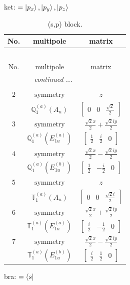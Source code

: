 \documentclass[fleqn,8pt,landscape]{jsarticle}
\begin{document}
\noindent
ket: $=\ket{p_{x}}, \ket{p_{y}}, \ket{p_{z}}$
\renewcommand{\arraystretch}{1.6}
\begin{longtable}{ccc}
\caption{(s,p) block.}
 \\
 \hline \hline
No. & multipole & matrix \\ \hline \endfirsthead

\multicolumn{2}{l}{\tablename\ \thetable{}} \\
 \hline \hline
No. & multipole & matrix \\ \hline \endhead

 \hline \hline
\multicolumn{2}{r}{\footnotesize\it continued ...} \\ \endfoot

 \hline \hline
\multicolumn{2}{r}{} \\ \endlastfoot

$ 2 $ & $ \text{symmetry} $ & $ z $ \\
$  $ & $ \mathbb{Q}_{1}^{(a)}(A_{u}) $ & $ \begin{bmatrix} 0 & 0 & \frac{\sqrt{2}}{2} \end{bmatrix} $ \\ \hline
$ 3 $ & $ \text{symmetry} $ & $ \frac{\sqrt{2} x}{2} + \frac{\sqrt{2} i y}{2} $ \\
$  $ & $ \mathbb{Q}_{1}^{(a)}(E_{1u}^{(a)}) $ & $ \begin{bmatrix} \frac{1}{2} & \frac{i}{2} & 0 \end{bmatrix} $ \\ \hline
$ 4 $ & $ \text{symmetry} $ & $ \frac{\sqrt{2} x}{2} - \frac{\sqrt{2} i y}{2} $ \\
$  $ & $ \mathbb{Q}_{1}^{(a)}(E_{1u}^{(b)}) $ & $ \begin{bmatrix} \frac{1}{2} & - \frac{i}{2} & 0 \end{bmatrix} $ \\ \hline
$ 5 $ & $ \text{symmetry} $ & $ z $ \\
$  $ & $ \mathbb{T}_{1}^{(a)}(A_{u}) $ & $ \begin{bmatrix} 0 & 0 & \frac{\sqrt{2} i}{2} \end{bmatrix} $ \\ \hline
$ 6 $ & $ \text{symmetry} $ & $ \frac{\sqrt{2} x}{2} + \frac{\sqrt{2} i y}{2} $ \\
$  $ & $ \mathbb{T}_{1}^{(a)}(E_{1u}^{(a)}) $ & $ \begin{bmatrix} \frac{i}{2} & - \frac{1}{2} & 0 \end{bmatrix} $ \\ \hline
$ 7 $ & $ \text{symmetry} $ & $ \frac{\sqrt{2} x}{2} - \frac{\sqrt{2} i y}{2} $ \\
$  $ & $ \mathbb{T}_{1}^{(a)}(E_{1u}^{(b)}) $ & $ \begin{bmatrix} \frac{i}{2} & \frac{1}{2} & 0 \end{bmatrix} $ \\ \hline
\end{longtable}
bra: $=\bra{s}$
\end{document}
